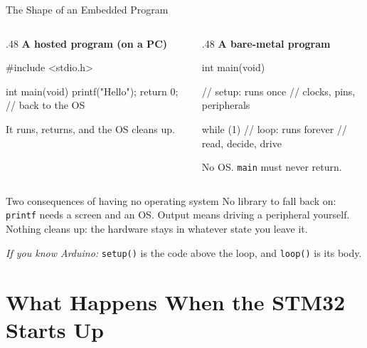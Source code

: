 \documentclass[9pt,aspectratio=169,xcolor=table]{beamer}
\begin{document}
\begin{frame}[fragile]{The Shape of an Embedded Program}
    \begin{columns}[T]
    \begin{column}{.48\textwidth}
        \textbf{A hosted program (on a PC)}
\begin{cc}[basicstyle=\ttfamily\footnotesize]
#include <stdio.h>

int main(void) {
    printf("Hello\n");
    return 0;   // back to the OS
}
\end{cc}
        {\small It runs, returns, and the OS cleans up.}
    \end{column}
    \begin{column}{.48\textwidth}
        \textbf{A bare-metal program}
\begin{cc}[basicstyle=\ttfamily\footnotesize]
int main(void) {
    // setup: runs once
    //   clocks, pins, peripherals

    while (1) {
        // loop: runs forever
        //   read, decide, drive
    }
}
\end{cc}
        {\small No OS. \texttt{main} must never return.}
    \end{column}
    \end{columns}

    \vspace{2mm}
    \begin{block}{Two consequences of having no operating system}
        \alert{No library to fall back on:} \texttt{printf} needs a screen and an OS. Output means driving a peripheral yourself. \alert{Nothing cleans up:} the hardware stays in whatever state you leave it.
    \end{block}

    \vspace{1mm}
    {\small \emph{If you know Arduino:} \texttt{setup()} is the code above the loop, and \texttt{loop()} is its body.}
\end{frame}


\section{What Happens When the STM32 Starts Up}
\end{document}
